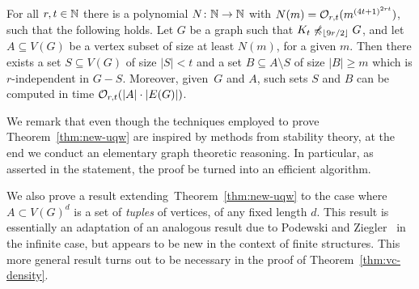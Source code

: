 \pagebreak
{}
\setcounter{uqw}{\value{theorem}}
\begin{theorem}\label{thm:new-uqw}
For all $r,t\in \mathbb{N}$ there is a polynomial  $N\colon \mathbb{N}\to \mathbb{N}$ with $N(m)=
\mathcal{O}_{r,t}{(m^{{(4t+1)}^{2rt}})}$, such that the following holds.
Let $G$ be a graph such that $K_t\not\preccurlyeq_{\lfloor 9r/2\rfloor} G$, and
let $A\subseteq V(G)$ be a vertex subset of size at least $N(m)$, for a given $m$.
Then there exists a set $S\subseteq V(G)$ of size $|S|<t$ and a set $B\subseteq A\setminus S$ 
of size $|B|\geq m$ which is $r$-independent in $G-S$.
Moreover, given~$G$ and $A$, such sets $S$ and $B$ can be computed in time $\mathcal{O}_{r,t}(|A|\cdot |E(G)|)$. 
\end{theorem}

We remark
that even though the techniques employed to prove Theorem~\ref{thm:new-uqw} are inspired by methods from stability theory, 
at the end we conduct an elementary graph theoretic reasoning. In particular, as asserted in the statement, the
proof be turned into an efficient algorithm.

We also prove a result extending~Theorem~\ref{thm:new-uqw}
to the case where $A\subset V(G)^d$ is a set of \emph{tuples} of vertices, of any fixed length $d$.
This result is essentially an adaptation of an analogous result due to Podewski and Ziegler~\cite{podewski1978stable} in the infinite case,
but appears to be new in the context of finite structures.
This more general result turns out to be necessary in the proof of Theorem~\ref{thm:vc-density}.

